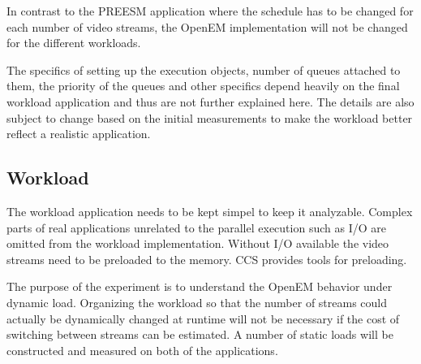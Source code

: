 In contrast to the PREESM application where the schedule has to be changed for each number of video streams, the OpenEM implementation will not be changed for the different workloads.

The specifics of setting up the execution objects, number of queues attached to them, the priority of the queues and other specifics depend heavily on the final workload application and thus are not further explained here. The details are also subject to change based on the initial measurements to make the workload better reflect a realistic application.
\subsection{Workload}
The workload application needs to be kept simpel to keep it analyzable. Complex parts of real applications unrelated to the parallel execution such as I/O are omitted from the workload implementation. Without I/O available the video streams need to be preloaded to the memory. CCS provides tools for preloading.

The purpose of the experiment is to understand the OpenEM behavior under dynamic load. Organizing the workload so that the number of streams could actually be dynamically changed at runtime will not be necessary if the cost of switching between streams can be estimated. A number of static loads will be constructed and measured on both of the applications.